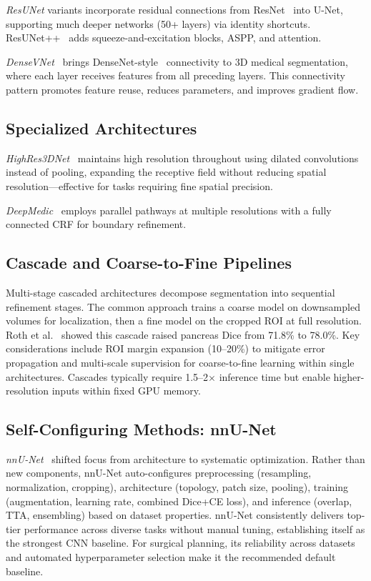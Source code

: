 \documentclass[conference]{IEEEtran}
\begin{document}
\emph{ResUNet} variants incorporate residual connections from ResNet~\cite{he2016resnet} into U-Net, supporting much deeper networks (50+ layers) via identity shortcuts. ResUNet++~\cite{jha2019resunetpp} adds squeeze-and-excitation blocks, ASPP, and attention.

\emph{DenseVNet}~\cite{gibson2018densevnet} brings DenseNet-style~\cite{huang2017densely} connectivity to 3D medical segmentation, where each layer receives features from all preceding layers. This connectivity pattern promotes feature reuse, reduces parameters, and improves gradient flow.

\subsection{Specialized Architectures}

\emph{HighRes3DNet}~\cite{li2017highres3dnet} maintains high resolution throughout using dilated convolutions instead of pooling, expanding the receptive field without reducing spatial resolution---effective for tasks requiring fine spatial precision.

\emph{DeepMedic}~\cite{kamnitsas2017deepmedic} employs parallel pathways at multiple resolutions with a fully connected CRF for boundary refinement.

\subsection{Cascade and Coarse-to-Fine Pipelines}
\label{sec:cascades}

Multi-stage cascaded architectures decompose segmentation into sequential refinement stages. The common approach trains a coarse model on downsampled volumes for localization, then a fine model on the cropped ROI at full resolution. Roth et al.~\cite{roth2017hierarchical, roth2018cascaded} showed this cascade raised pancreas Dice from 71.8\% to 78.0\%. Key considerations include ROI margin expansion (10--20\%) to mitigate error propagation and multi-scale supervision for coarse-to-fine learning within single architectures. Cascades typically require 1.5--2$\times$ inference time but enable higher-resolution inputs within fixed GPU memory.

\subsection{Self-Configuring Methods: nnU-Net}

\emph{nnU-Net}~\cite{isensee2021nnunet} shifted focus from architecture to systematic optimization. Rather than new components, nnU-Net auto-configures preprocessing (resampling, normalization, cropping), architecture (topology, patch size, pooling), training (augmentation, learning rate, combined Dice+CE loss), and inference (overlap, TTA, ensembling) based on dataset properties. nnU-Net consistently delivers top-tier performance across diverse tasks without manual tuning, establishing itself as the strongest CNN baseline. For surgical planning, its reliability across datasets and automated hyperparameter selection make it the recommended default baseline.
\end{document}
